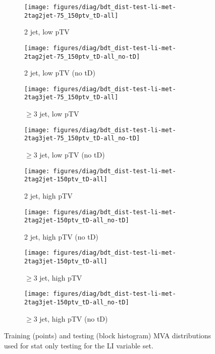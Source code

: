 \begin{figure}[!htbp]\captionsetup{justification=centering}
  \centering
  \begin{subfigure}[t]{0.49\textwidth}\centering\texttt{[image: figures/diag/bdt\_dist-test-li-met-2tag2jet-75\_150ptv\_tD-all]}\caption{2 jet, low pTV}\end{subfigure}
  \begin{subfigure}[t]{0.49\textwidth}\centering\texttt{[image: figures/diag/bdt\_dist-test-li-met-2tag2jet-75\_150ptv\_tD-all\_no-tD]}\caption{2 jet, low pTV (no tD)}\end{subfigure}
  \begin{subfigure}[t]{0.49\textwidth}\centering\texttt{[image: figures/diag/bdt\_dist-test-li-met-2tag3jet-75\_150ptv\_tD-all]}\caption{$\ge3$ jet, low pTV}\end{subfigure}
  \begin{subfigure}[t]{0.49\textwidth}\centering\texttt{[image: figures/diag/bdt\_dist-test-li-met-2tag3jet-75\_150ptv\_tD-all\_no-tD]}\caption{$\ge3$ jet, low pTV (no tD)}\end{subfigure}
  \begin{subfigure}[t]{0.49\textwidth}\centering\texttt{[image: figures/diag/bdt\_dist-test-li-met-2tag2jet-150ptv\_tD-all]}\caption{2 jet, high pTV}\end{subfigure}
  \begin{subfigure}[t]{0.49\textwidth}\centering\texttt{[image: figures/diag/bdt\_dist-test-li-met-2tag2jet-150ptv\_tD-all\_no-tD]}\caption{2 jet, high pTV (no tD)}\end{subfigure}
  \begin{subfigure}[t]{0.49\textwidth}\centering\texttt{[image: figures/diag/bdt\_dist-test-li-met-2tag3jet-150ptv\_tD-all]}\caption{$\ge3$ jet, high pTV}\end{subfigure}
  \begin{subfigure}[t]{0.49\textwidth}\centering\texttt{[image: figures/diag/bdt\_dist-test-li-met-2tag3jet-150ptv\_tD-all\_no-tD]}\caption{$\ge3$ jet, high pTV (no tD)}\end{subfigure}
  \caption{Training (points) and testing (block histogram) MVA distributions used for stat only testing for the LI variable set.}
  \label{fig:li-met-testing}
\end{figure}

